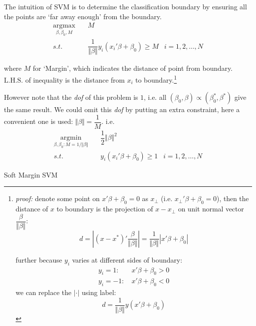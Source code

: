     The intuition of SVM is to determine the classification boundary by ensuring all the points are `far away enough' from the boundary.
\begin{equation*}
    \begin{aligned}
    \mathop{\arg\max}\limits_{\beta ,\beta _0,M}\quad &M\\
    s.t.\quad & \dfrac{1}{\Vert \beta  \Vert }y_i(x_i'\beta +\beta _0)\geq M&i=1,2,\ldots,N
    \end{aligned}
\end{equation*}

    where $ M $ for `Margin', which indicates the distance of point from boundary. $  \mathrm{L.H.S.} $ of inequality is the distance from $ x_i $ to boundary.\footnote{\textit{proof:} denote some point on $ x'\beta +\beta _0=0 $ as $ x_\perp $ (i.e. $ x_\perp'\beta +\beta _0=0 $), then the distance of $ x $ to boundary is the projection of $ x-x_\perp $ on unit normal vector $ \dfrac{\beta }{\Vert \beta  \Vert } $:
    \[
        d=\left|(x-x^*)' \dfrac{\beta }{\Vert \beta  \Vert }\right|=\dfrac{1}{\Vert \beta  \Vert }|x'\beta +\beta _0|
    \]

    further because $ y_i $ varies at different sides of boundary:
    \begin{align}
        y_i=1:\,&x'\beta +\beta _0>0\\
        y_i=-1:\,&x'\beta +\beta _0<0
    \end{align}
    we can replace the $ |\cdot| $ using label:
    \[
        d=\dfrac{1}{\Vert \beta  \Vert }y(x'\beta +\beta _0) 
    \]
    }

    However note that the \textit{dof} of this problem is $ 1 $, i.e. all $ (\beta_0,\beta) \propto (\beta _0^*,\beta ^*) $ give the same result. We could omit this \textit{dof} by putting an extra constraint, here a convenient one is used: $ \Vert \beta  \Vert =\dfrac{1}{M} $. i.e.
    \begin{equation*}
        \begin{aligned}
        \mathop{\arg\min}\limits_{\beta ,\beta _0:M=1/\Vert \beta  \Vert }\quad &\dfrac{1}{2}\Vert \beta  \Vert^2 \\
        s.t.\quad & y_i(x_i'\beta +\beta _0)\geq 1&i=1,2,\ldots,N
        \end{aligned}
    \end{equation*}

\begin{point}
    Soft Margin SVM
\end{point}

